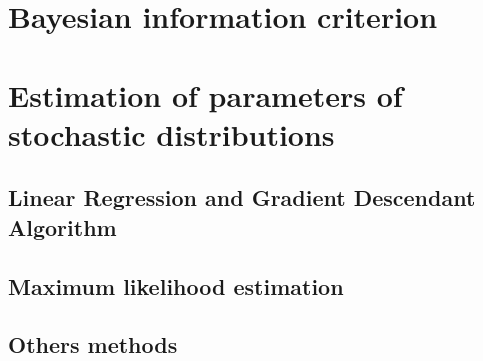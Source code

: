 \section{Bayesian information criterion}

\section{Estimation of parameters of stochastic distributions}

\subsection{Linear Regression and Gradient Descendant Algorithm}

\subsection{Maximum likelihood estimation}

\subsection{Others methods}

